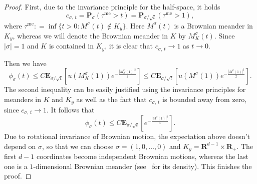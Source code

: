 \documentclass[AHL,Unicode,longabstracts,published]{cedram}
\DeclareMathOperator{\me}{me}
\newcommand{\pr}{\mathbf{P}}
\newcommand{\e}{\mathbf{E}}
\newcommand{\bfR}{\mathbf{R}}
\newcommand{\ra}{\rightarrow}
\renewcommand{\le}{\leqslant}
\begin{document}
\begin{proof}
First, due to the invariance principle for the half-space, it holds
\[
c_{\sigma,\,t} = \pr_{\sigma}\left(\tau^{\me}>t\right) = \pr_{\sigma/\sqrt{t}}\left(\tau^{\me}>1\right),
\]
where $\tau^{\me}: = \inf\{t>0:M^{\sigma}(t)\not\in K_y\}$. Here $M^{\sigma}(t)$ is a Brownian meander in $K_{y}$, whereas we will denote the Brownian meander in $K$ by $M_K^{\sigma}(t)$. Since $|\sigma| = 1$ and $K$ is contained in $K_y$, it is clear that $c_{\sigma,\,t}\ra 1$ as $t\ra 0$.

Then we have
\[
\phi_{\sigma}(t)\le C\e_{\sigma/\sqrt{t}}\left[u\left(M_K^{\sigma}(1)\right)e^{-\frac{\left|M_K^{\sigma}(1)\right|^2}{2}}\right]\le C\e_{\sigma/\sqrt{t}}\left[u\left(M^{\sigma}(1)\right)e^{-\frac{\left| M^{\sigma}(1)\right|^2}{2}}\right].
\]
The second inequality can be easily justified using the invariance principles for meanders in $K$ and $K_y$ as well as the fact that $c_{\sigma,\,t}$ is bounded away from zero, since $c_{\sigma,\,t}\ra 1$. It follows that
\[
\phi_{\sigma}(t)\le C\e_{\sigma/\sqrt{t}}\left[e^{-\frac{\left| M^{\sigma}(1)\right|^2}{4}}\right].
\]
Due to rotational invariance of Brownian motion, the expectation above doesn't depend on $\sigma$, so that we can choose $\sigma = (1,0,\ldots,0)$ and $K_y = \bfR^{d-1}\times \bfR_+$. The first $d-1$ coordinates become independent Brownian motions, whereas the last one is a $1$-dimensional Brownian meander (see~\cite{DuIgMi-77} for its density). This finishes the proof.
\end{proof}
\end{document}
